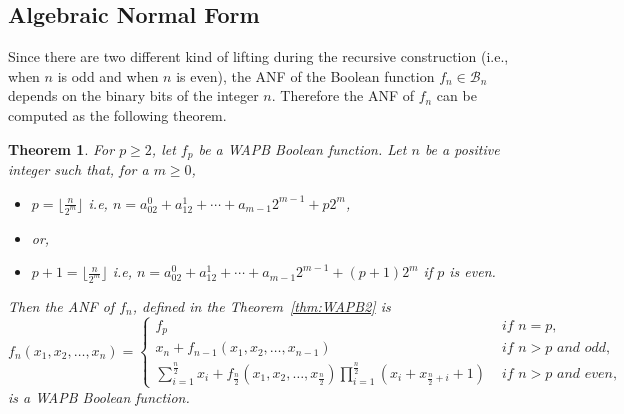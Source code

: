 \documentclass{article}[12pt]
\newtheorem{theorem}{Theorem}[section]
\newcommand{\CB}{\mathcal{B}}
\begin{document}
\subsection{Algebraic Normal Form}\label{ssec:anf}
Since there are two different kind of lifting during the recursive construction (i.e., when $n$ is odd and when $n$ is even), the ANF of the Boolean function $f_n \in \CB_n$ depends on the binary bits of the integer $n$. Therefore the ANF of $f_n$ can be computed as the following theorem.
\begin{theorem}\label{thm:ANF}
    For $p \geq 2$, let $f_p$ be a WAPB Boolean function.
    Let $n$ be a positive integer such that, for a $m \geq 0$,
    \begin{itemize}
     \item $p = \lfloor\frac{n}{2^m}\rfloor$ i.e, $n = a_02^0 + a_12^1 + \cdots + a_{m-1}2^{m-1} + p2^m$,
     \item [] or,
     \item $p + 1 = \lfloor\frac{n}{2^m}\rfloor$ i.e, $n = a_02^0 + a_12^1 + \cdots + a_{m-1}2^{m-1} + (p+1)2^m$ if $p$ is even.
    \end{itemize}
 Then the ANF of $f_n$, defined in the Theorem~\ref{thm:WAPB2} is 
	\begin{equation}\label{eq:anf}
	f_n(x_1, x_2, \ldots, x_n) =
	\begin{cases} 
	f_p & \textit{ if } n = p, \\
	x_n + f_{n-1}(x_1, x_2, \ldots, x_{n-1}) & \textit{ if } n > p \textit{ and odd},\\ 
   \displaystyle{\sum_{i=1}^{\frac{n}{2}} x_{i} + f_{\frac{n}{2}}(x_1,x_2,\ldots,x_\frac{n}{2})\prod_{i=1}^{\frac{n}{2}} (x_i + x_{\frac{n}{2} + i} + 1) }      & \textit{ if } n > p \textit{ and even},
   \end{cases}
   \end{equation}	
 is a WAPB Boolean function.
 \end{theorem}
\end{document}
